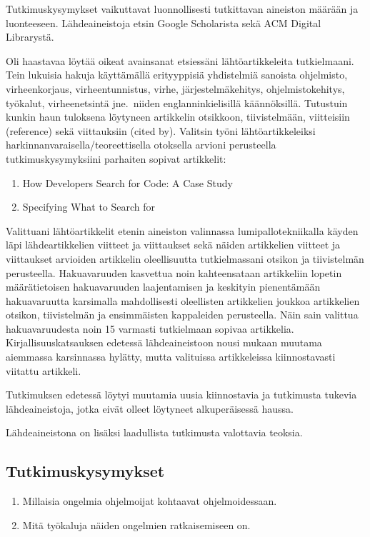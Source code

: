 \documentclass[finnish]{tktltiki2}
\theoremstyle{definition}
\theoremstyle{remark}
\begin{document}
Tutkimuskysymykset vaikuttavat luonnollisesti tutkittavan aineiston määrään ja luonteeseen. Lähdeaineistoja etsin Google Scholarista sekä ACM Digital Librarystä.

Oli haastavaa löytää oikeat avainsanat etsiessäni lähtöartikkeleita tutkielmaani. Tein lukuisia hakuja käyttämällä erityyppisiä yhdistelmiä sanoista ohjelmisto, virheenkorjaus, virheentunnistus, virhe, järjestelmäkehitys, ohjelmistokehitys, työkalut, virheenetsintä jne.\ niiden englanninkielisillä käännöksillä. Tutustuin kunkin haun tuloksena löytyneen artikkelin otsikkoon, tiivistelmään, viitteisiin (reference) sekä viittauksiin (cited by). Valitsin työni lähtöartikkeleiksi harkinnanvaraisella/teoreettisella otoksella arvioni perusteella tutkimuskysymyksiini parhaiten sopivat artikkelit:

\begin{enumerate}
  \item How Developers Search for Code: A Case Study~\cite{g_search_code}
  \item Specifying What to Search for~\cite{what-to-search-for}
\end{enumerate}
Valittuani lähtöartikkelit etenin aineiston valinnassa lumipallotekniikalla
käyden läpi lähdeartikkelien viitteet ja viittaukset sekä näiden artikkelien viitteet ja viittaukset arvioiden artikkelin oleellisuutta tutkielmassani otsikon ja tiivistelmän perusteella. Hakuavaruuden kasvettua noin kahteensataan artikkeliin lopetin määrätietoisen hakuavaruuden laajentamisen ja keskityin pienentämään hakuavaruutta karsimalla mahdollisesti oleellisten artikkelien joukkoa artikkelien otsikon, tiivistelmän ja ensimmäisten kappaleiden perusteella. Näin sain valittua hakuavaruudesta noin 15 varmasti tutkielmaan sopivaa artikkelia.  Kirjallisuuskatsauksen edetessä lähdeaineistoon nousi mukaan muutama aiemmassa karsinnassa hylätty, mutta valituissa artikkeleissa kiinnostavasti viitattu artikkeli.

Tutkimuksen edetessä löytyi muutamia uusia kiinnostavia ja tutkimusta tukevia lähdeaineistoja, jotka eivät olleet löytyneet alkuperäisessä haussa.

Lähdeaineistona on lisäksi laadullista tutkimusta valottavia teoksia.

\subsection{Tutkimuskysymykset}
\begin{enumerate}
\item Millaisia ongelmia ohjelmoijat kohtaavat ohjelmoidessaan.
\item Mitä työkaluja näiden ongelmien ratkaisemiseen on.
\end{enumerate}
\end{document}
